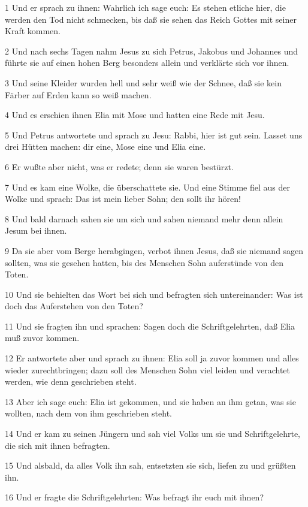 \par 1 Und er sprach zu ihnen: Wahrlich ich sage euch: Es stehen etliche hier, die werden den Tod nicht schmecken, bis daß sie sehen das Reich Gottes mit seiner Kraft kommen.
\par 2 Und nach sechs Tagen nahm Jesus zu sich Petrus, Jakobus und Johannes und führte sie auf einen hohen Berg besonders allein und verklärte sich vor ihnen.
\par 3 Und seine Kleider wurden hell und sehr weiß wie der Schnee, daß sie kein Färber auf Erden kann so weiß machen.
\par 4 Und es erschien ihnen Elia mit Mose und hatten eine Rede mit Jesu.
\par 5 Und Petrus antwortete und sprach zu Jesu: Rabbi, hier ist gut sein. Lasset uns drei Hütten machen: dir eine, Mose eine und Elia eine.
\par 6 Er wußte aber nicht, was er redete; denn sie waren bestürzt.
\par 7 Und es kam eine Wolke, die überschattete sie. Und eine Stimme fiel aus der Wolke und sprach: Das ist mein lieber Sohn; den sollt ihr hören!
\par 8 Und bald darnach sahen sie um sich und sahen niemand mehr denn allein Jesum bei ihnen.
\par 9 Da sie aber vom Berge herabgingen, verbot ihnen Jesus, daß sie niemand sagen sollten, was sie gesehen hatten, bis des Menschen Sohn auferstünde von den Toten.
\par 10 Und sie behielten das Wort bei sich und befragten sich untereinander: Was ist doch das Auferstehen von den Toten?
\par 11 Und sie fragten ihn und sprachen: Sagen doch die Schriftgelehrten, daß Elia muß zuvor kommen.
\par 12 Er antwortete aber und sprach zu ihnen: Elia soll ja zuvor kommen und alles wieder zurechtbringen; dazu soll des Menschen Sohn viel leiden und verachtet werden, wie denn geschrieben steht.
\par 13 Aber ich sage euch: Elia ist gekommen, und sie haben an ihm getan, was sie wollten, nach dem von ihm geschrieben steht.
\par 14 Und er kam zu seinen Jüngern und sah viel Volks um sie und Schriftgelehrte, die sich mit ihnen befragten.
\par 15 Und alsbald, da alles Volk ihn sah, entsetzten sie sich, liefen zu und grüßten ihn.
\par 16 Und er fragte die Schriftgelehrten: Was befragt ihr euch mit ihnen?
